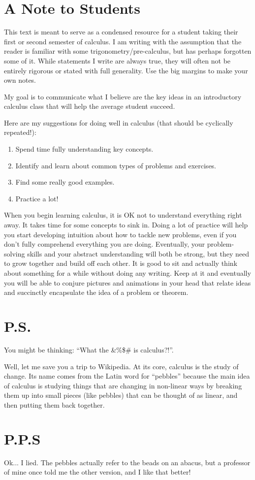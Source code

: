 
\section*{A Note to Students}
This text is meant to serve as a condensed resource for a student taking their first or second semester of calculus. I am writing with the assumption that the reader is familiar with some trigonometry/pre-calculus, but has perhaps forgotten some of it. While statements I write are always true, they will often not be entirely rigorous or stated with full generality. Use the big margins to make your own notes.  

My goal is to communicate what I believe are the key ideas in an introductory calculus class that will help the average student succeed.

Here are my suggestions for doing well in calculus (that should be cyclically repeated!):

\begin{enumerate}
\item Spend time fully understanding key concepts.
\item Identify and learn about common types of problems and exercises.
\item Find some really good examples.
\item Practice a lot!
\end{enumerate}

When you begin learning calculus, it is OK not to understand everything right away. It takes time for some concepts to sink in. Doing a lot of practice will help you start developing intuition about how to tackle new problems, even if you don't fully comprehend everything you are doing. Eventually, your problem-solving skills and your abstract understanding will both be strong, but they need to grow together and build off each other. It is good to sit and actually think about something for a while without doing any writing. Keep at it and eventually you will be able to conjure pictures and animations in your head that relate ideas and succinctly encapsulate the idea of a problem or theorem.


\section*{P.S.}
You might be thinking: ``What the \&\%\$\# is calculus?!''.

Well, let me save you a trip to Wikipedia. At its core, calculus is the study of change. Its name comes from the Latin word for ``pebbles'' because the main idea of calculus is studying things that are changing in non-linear ways by breaking them up into small pieces (like pebbles) that can be thought of as linear, and then putting them back together.

\section*{P.P.S}
Ok... I lied. The pebbles actually refer to the beads on an abacus, but a professor of mine once told me the other version, and I like that better!

